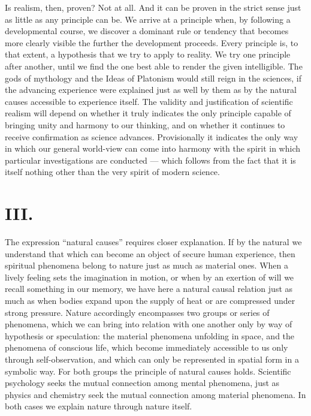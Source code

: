 \documentclass[12pt,a4paper,openany]{book}
\newcommand{\opage}[1]{\marginnote{\footnotesize\textit{[#1]}}}
\begin{document}
Is realism, then, proven? Not at all. And it can be proven in the strict sense just as little as any principle can be. We arrive at a principle when, by following a developmental course, we discover a dominant rule or tendency that becomes more clearly visible the further the development proceeds. Every principle is, to that extent, a hypothesis that we try to apply to reality. We try one principle after another, until we find the one best able to render the given intelligible. The gods of mythology and the Ideas of Platonism would still reign in the sciences, if the advancing experience were explained just as well by them as by the natural
\opage{7}causes accessible to experience itself. The validity and justification of scientific realism will depend on whether it truly indicates the only principle capable of bringing unity and harmony to our thinking, and on whether it continues to receive confirmation as science advances. Provisionally it indicates the only way in which our general world-view can come into harmony with the spirit in which particular investigations are conducted --- which follows from the fact that it is itself nothing other than the very spirit of modern science.

\section*{III.}

The expression ``natural causes'' requires closer explanation. If by the natural we understand that which can become an object of secure human experience, then spiritual phenomena belong to nature just as much as material ones. When a lively feeling sets the imagination in motion, or when by an exertion of will we recall something in our memory, we have here a natural causal relation just as much as when bodies expand upon the supply of heat or are compressed under strong pressure. Nature accordingly encompasses two groups or series of phenomena, which we can bring into relation with one another only by way of hypothesis or speculation: the material phenomena unfolding in space, and the phenomena of conscious life, which become immediately accessible to us only through self-observation, and which can only be represented in spatial form in a symbolic way. For both groups the principle of natural causes holds. Scientific psychology seeks the mutual connection among mental phenomena, just as physics and chemistry seek the mutual connection among material phenomena. In both cases we explain nature through nature itself.
\end{document}
